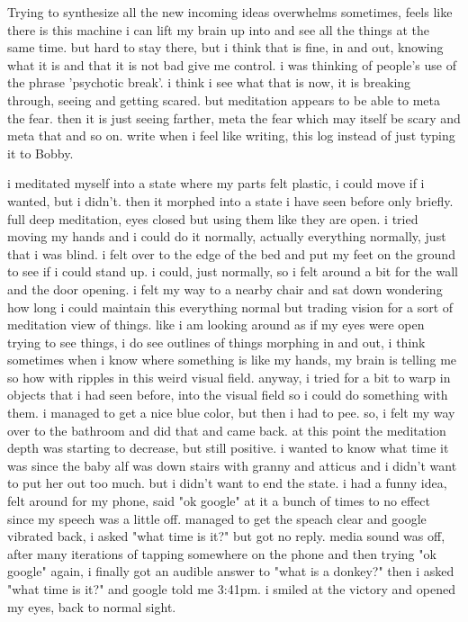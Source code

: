 \documentclass[12pt]{article}
\title{}
\begin{document}
\maketitle
Trying to synthesize all the new incoming ideas overwhelms sometimes, feels like there is this machine i can lift my brain up into and see all the things
at the same time. but hard to stay there, but i think that is fine, in and out, knowing what it is and that it is not bad give me control. i was thinking
of people's use of the phrase 'psychotic break'.  i think i see what that is now, it is breaking through, seeing and getting scared.  but meditation appears
to be able to meta the fear.  then it is just seeing farther, meta the fear which may itself be scary and meta that and so on.  write when i feel
like writing, this log instead of just typing it to Bobby.

i meditated myself into a state where my parts felt plastic, i could move if i wanted, but i didn't.  then it morphed into a state
i have seen before only briefly.  full deep meditation, eyes closed but using them like they are open.  i tried moving my hands and
i could do it normally, actually everything normally, just that i was blind.  i felt over to the edge of the bed and put
my feet on the ground to see if i could stand up.  i could, just normally, so i felt around a bit for the wall and the door
opening.  i felt my way to a nearby chair and sat down wondering how long i could maintain this everything normal but trading vision for a sort
of meditation view of things.  like i am looking around as if my eyes were open trying to see things, i do see outlines of things morphing in
and out, i think sometimes when i know where something is like my hands, my brain is telling me so how with ripples in this weird visual field.
anyway, i tried for a bit to warp in objects that i had seen before, into the visual field so i could do something with them.  i managed to get
a nice blue color, but then i had to pee.  so, i felt my way over to the bathroom and did that and came back.  at this point the meditation depth
was starting to decrease, but still positive.  i wanted to know what time it was since the baby alf was down stairs with granny and atticus and
i didn't want to put her out too much.  but i didn't want to end the state.  i had a funny idea, felt around for my phone, said "ok google" at it
a bunch of times to no effect since my speech was a little off.  managed to get the speach clear and google vibrated back, i asked "what time is it?"
but got no reply.  media sound was off, after many iterations of tapping somewhere on the phone and then trying "ok google" again, i finally got an audible
answer to "what is a donkey?" then i asked "what time is it?" and google told me 3:41pm.  i smiled at the victory and opened my eyes, back to normal sight.
\end{document}
